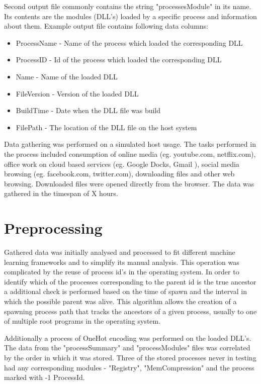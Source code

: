 \documentclass[a4paper,twoside,12pt]{book}
\begin{document}
Second output file commonly contains the string "processesModule" in its name. Its contents
are the modules (DLL's) loaded by a specific process and information about them. Example 
output file contains following data columns:
\begin{itemize}
	\item ProcessName - Name of the process which loaded the corresponding DLL
	\item ProcessID - Id of the process which loaded the corresponding DLL
	\item Name - Name of the loaded DLL
	\item FileVersion - Version of the loaded DLL
	\item BuildTime - Date when the DLL file was build
	\item FilePath - The location of the DLL file on the host system
\end{itemize}

Data gathering was performed on a simulated host usage. The tasks performed in the process 
included consumption of online media (eg. youtube.com, netflix.com), office work on cloud 
based services (eg. Google Docks, Gmail ), social media browsing (eg. facebook.com, 
twitter.com), downloading files and other web browsing. Downloaded files were opened 
directly from the browser. The data was gathered in the timespan of X hours. %

\section{Preprocessing}

Gathered data was initially analysed and processed to fit different machine learning 
frameworks and to simplify its manual analysis. This operation was complicated by the 
reuse of process id's in the operating system. In order to identify which of the processes 
corresponding to the parent id is the true ancestor a additional check is performed based 
on the time of spawn and the interval in which the possible parent was alive. This algorithm 
allows the creation of a spawning process path that tracks the ancestors of a given process, 
usually to one of multiple root programs in the operating system. 

Additionally a process of OneHot encoding was performed on the loaded DLL's. The data from 
the "processSummary" and "processModules" files was correlated by the order in which it was 
stored. Three of the stored processes never in testing had any corresponding modules - 
"Registry", "MemCompression" and the process marked with -1 ProcessId.
\end{document}
